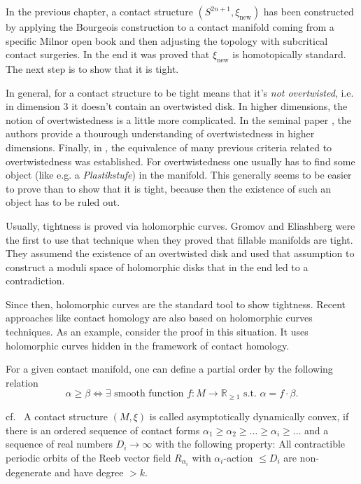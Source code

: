 In the previous chapter, a contact structure $(S^{2n+1}, \xi_\text{new})$ has been constructed by applying the Bourgeois construction
to a contact manifold coming from a specific Milnor open book and then adjusting the topology with subcritical contact surgeries.
In the end it was proved that $\xi_\text{new}$ is homotopically standard.
The next step is to show that it is tight. 

In general, for a contact structure to be tight means that it's \textit{not overtwisted}, i.e. in dimension 3 it doesn't contain an overtwisted disk.
In higher dimensions, the notion of overtwistedness is a little more complicated. 
In the seminal paper \cite{BEM15}, the authors provide a thourough understanding of overtwistedness in higher dimensions.
Finally, in \cite{CMP19}, the equivalence of many previous criteria related to overtwistedness was established.
For overtwistedness one usually has to find some object (like e.g. a \textit{Plastikstufe}) in the manifold.
This generally seems to be easier to prove than to show that it is tight, because then the existence of such an object has to be ruled out.

Usually, tightness is proved via holomorphic curves. Gromov and Eliashberg were the first to use that technique \cite{Gromov85,Eliashberg91}
when they proved that fillable manifolds are tight. They assumend the existence of an overtwisted disk and used that assumption to construct
a moduli space of holomorphic disks that in the end led to a contradiction.

Since then, holomorphic curves are the standard tool to show tightness.
Recent approaches like contact homology are also based on holomorphic curves techniques.
As an example, consider the proof in this situation. It uses holomorphic curves hidden in the framework of contact homology.

For a given contact manifold, one can define a partial order by the following relation
\[
    \alpha \geq \beta \Leftrightarrow \exists \text{ smooth function } f: M \to \mathbb R_{\geq 1} \text{ s.t. } \alpha = f \cdot \beta.
\]
\begin{definition}[k-ADC]cf.~\cite{Zhou21b,Lazarev20}
    A contact structure $(M, \xi)$ is called asymptotically dynamically convex, if there is an ordered sequence of contact forms 
    $\alpha_1 \geq \alpha_2 \geq \dots \geq \alpha_i \geq \dots$ and a sequence of real numbers $D_i \to \infty$
    with the following property:
    All contractible periodic orbits of the Reeb vector field $R_{\alpha_i}$ with $\alpha_i$-action $\leq D_i$ are non-degenerate
    and have degree $> k$.
\end{definition}

